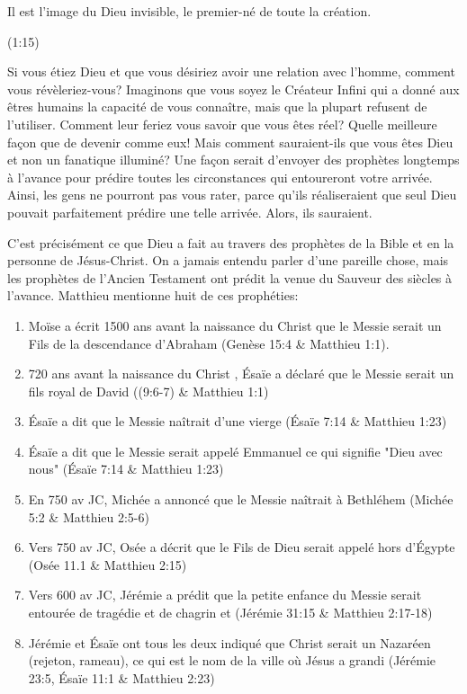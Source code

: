 
\epigraph{Il est l’image du Dieu invisible, le premier-né de toute la création.}{(1:15)}

Si vous étiez Dieu et que vous désiriez avoir une relation avec l'homme, comment vous révèleriez-vous? Imaginons que vous soyez le Créateur Infini qui a donné aux êtres humains la capacité de vous connaître, mais que la plupart refusent de l'utiliser. Comment leur feriez vous savoir que vous êtes réel? Quelle meilleure façon que de devenir comme eux! Mais comment sauraient-ils que vous êtes Dieu et non un fanatique illuminé? Une façon serait d'envoyer des prophètes longtemps à l'avance pour prédire toutes les circonstances qui entoureront votre arrivée. Ainsi, les gens ne pourront pas vous rater, parce qu'ils réaliseraient que seul Dieu pouvait parfaitement prédire une telle arrivée. Alors, ils sauraient.

C'est précisément ce que Dieu a fait au travers des prophètes de la Bible et en la personne de Jésus-Christ. On a jamais entendu parler d'une pareille chose, mais les prophètes de l'Ancien Testament ont prédit la venue du Sauveur des siècles à l'avance. Matthieu mentionne huit de ces prophéties:

\begin{enumerate}
\item Moïse a écrit 1500 ans avant la naissance du Christ que le Messie serait un Fils de la descendance d'Abraham (Genèse 15:4 \& Matthieu 1:1).
\item 720 ans avant la naissance du Christ , Ésaïe a déclaré que le Messie serait un fils royal de David ((9:6-7) \& Matthieu 1:1)
\item Ésaïe a dit que le Messie naîtrait d'une vierge (Ésaïe 7:14 \& Matthieu 1:23)
\item Ésaïe a dit que le Messie serait appelé Emmanuel ce qui signifie "Dieu avec nous" (Ésaïe 7:14 \& Matthieu 1:23)
\item En 750 av JC, Michée a annoncé que le Messie naîtrait à Bethléhem (Michée 5:2 \& Matthieu 2:5-6)
\item Vers 750 av JC, Osée a décrit que le Fils de Dieu serait appelé hors d'Égypte (Osée 11.1 \& Matthieu 2:15)
\item Vers 600 av JC, Jérémie a prédit que la petite enfance du Messie serait entourée de tragédie et de chagrin et (Jérémie 31:15 \& Matthieu 2:17-18)
\item Jérémie et Ésaïe ont tous les deux indiqué que Christ serait un Nazaréen (rejeton, rameau), ce qui est le nom de la ville où Jésus a grandi (Jérémie 23:5, Ésaïe 11:1 \& Matthieu 2:23)
\end{enumerate}

